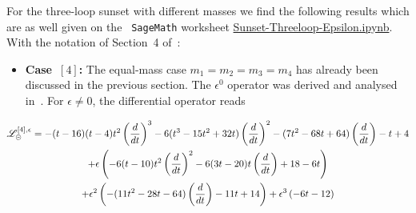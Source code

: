 \documentclass[a4paper,12pt]{article}
\numberwithin{equation}{section}
\numberwithin{figure}{section}
\def\su{\circleddash}
\begin{document}
For the three-loop sunset with different masses we find the following
results which are as well given on the  {\tt
  SageMath} worksheet \href{Sunset-Threeloop-Epsilon.ipynb}{Sunset-Threeloop-Epsilon.ipynb}. With the notation of Section~4 of~\cite{Lairez:2022zkj}:
%
\begin{itemize}
\item  {\bf Case~$[4]$:} The equal-mass case $m_1=m_2=m_3=m_4$ has already been
  discussed in the previous section. The $\epsilon^0$ operator was derived and analysed in~\cite{Vanhove:2014wqa,Bloch:2014qca,Pogel:2022yat}. For $ \epsilon \ne 0$, the differential operator reads
   \end{itemize}
  \begin{multline}
    \mathscr{L}_\su^{[4],\epsilon}=
    -(t - 16)  (t - 4)  t^2\left(d\over dt\right)^3 - 6  (t^3 -
                              15  t^2 + 32  t)  \left(d\over dt\right)^2 - (7  t^2 - 68  t +
                              64)  \left(d\over dt\right) - t + 4\cr
                              +\epsilon \left(-6  (t - 10  ) t^2 \left(d\over dt\right)^2 -
      6  (3  t - 20  ) t \left(d\over dt\right) +18- 6  t 
      \right)\cr
    +\epsilon^2\left(-(11  t^2 -
      28  t - 64)  \left(d\over dt\right) - 11  t + 14\right)+ \epsilon^3\left(-6  t - 12\right)
  \end{multline}
\end{document}
